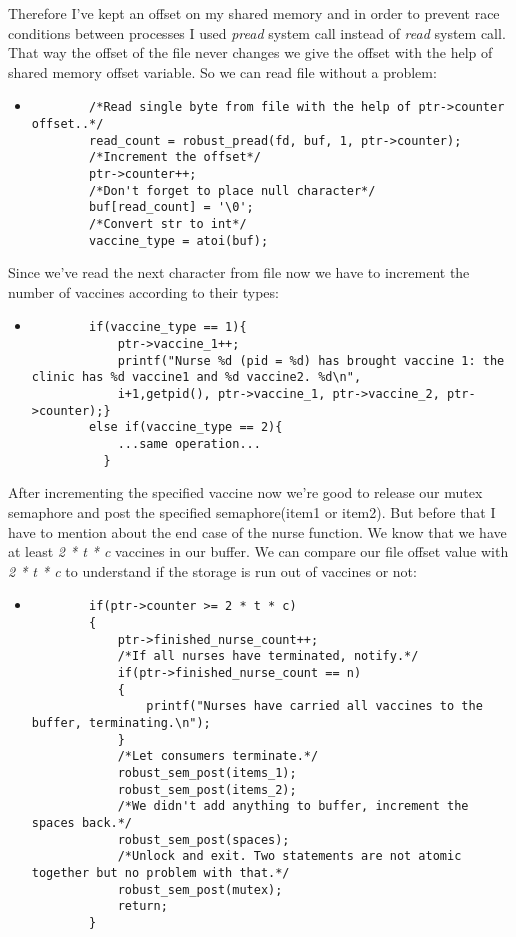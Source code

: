 \documentclass{article}
\begin{document}
\begin{itemize}
\quad Therefore I've kept an offset on my shared memory and in order to prevent race conditions between processes I used \textit{pread} system call instead of \textit{read} system call. That way the offset of the file never changes we give the offset with the help of shared memory offset variable. So we can read file without a problem:

\begin{itemize}
  \item 
    \begin{lstlisting}
        /*Read single byte from file with the help of ptr->counter offset..*/
        read_count = robust_pread(fd, buf, 1, ptr->counter);
        /*Increment the offset*/
        ptr->counter++;
        /*Don't forget to place null character*/
        buf[read_count] = '\0';
        /*Convert str to int*/
        vaccine_type = atoi(buf);
    \end{lstlisting}
\end{itemize}

\quad Since we've read the next character from file now we have to increment the number of vaccines according to their types:
\begin{itemize}
  \item 
    \begin{lstlisting}
        if(vaccine_type == 1){
            ptr->vaccine_1++;
            printf("Nurse %d (pid = %d) has brought vaccine 1: the clinic has %d vaccine1 and %d vaccine2. %d\n",
            i+1,getpid(), ptr->vaccine_1, ptr->vaccine_2, ptr->counter);}
        else if(vaccine_type == 2){
            ...same operation...
          } 
    \end{lstlisting}
\end{itemize}
\quad After incrementing the specified vaccine now we're good to release our mutex semaphore and post the specified semaphore(item1 or item2). But before that I have to mention about the end case of the nurse function. We know that we have at least \textit{2 * t * c} vaccines in our buffer. We can compare our file offset value with \textit{2 * t * c} to understand if the storage is run out of vaccines or not:

\begin{itemize}
  \item 
    \begin{lstlisting}
        if(ptr->counter >= 2 * t * c)
        {
            ptr->finished_nurse_count++;
            /*If all nurses have terminated, notify.*/
            if(ptr->finished_nurse_count == n)
            {
                printf("Nurses have carried all vaccines to the buffer, terminating.\n");
            }
            /*Let consumers terminate.*/
            robust_sem_post(items_1);
            robust_sem_post(items_2);
            /*We didn't add anything to buffer, increment the spaces back.*/
            robust_sem_post(spaces);
            /*Unlock and exit. Two statements are not atomic together but no problem with that.*/
            robust_sem_post(mutex);
            return;
        }
    \end{lstlisting}
\end{itemize}


\end{itemize}
\end{document}
